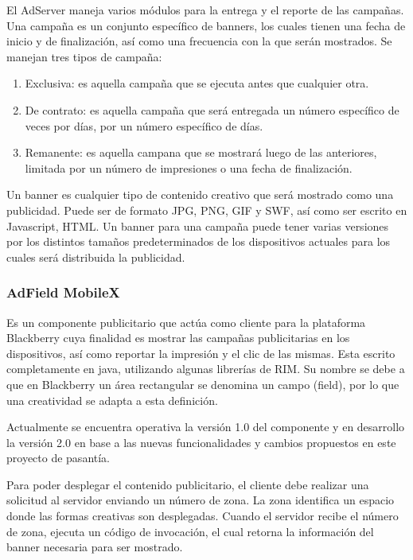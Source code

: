 El AdServer maneja varios módulos para la entrega y el reporte de
las campañas. Una campaña es un conjunto específico de banners, los
cuales tienen una fecha de inicio y de finalización, así como una
frecuencia con la que serán mostrados. Se manejan tres tipos de campaña:
\begin{enumerate}
\item Exclusiva: es aquella campaña que se ejecuta antes que cualquier otra. 
\item De contrato: es aquella campaña que será entregada un número específico
de veces por días, por un número específico de días. 
\item Remanente: es aquella campana que se mostrará luego de las anteriores,
limitada por un número de impresiones o una fecha de finalización. 
\end{enumerate}
Un banner es cualquier tipo de contenido creativo que será mostrado
como una publicidad. Puede ser de formato JPG, PNG, GIF y SWF, así
como ser escrito en Javascript, HTML. Un banner para una campaña puede
tener varias versiones por los distintos tamaños predeterminados de
los dispositivos actuales para los cuales será distribuida la publicidad.


\subsubsection{AdField MobileX}

Es un componente publicitario que actúa como cliente para la plataforma
Blackberry cuya finalidad es mostrar las campañas publicitarias en
los dispositivos, así como reportar la impresión y el clic de las
mismas. Esta escrito completamente en java, utilizando algunas librerías
de RIM. Su nombre se debe a que en Blackberry un área rectangular
se denomina un campo (field), por lo que una creatividad se adapta
a esta definición.

Actualmente se encuentra operativa la versión 1.0 del componente y
en desarrollo la versión 2.0 en base a las nuevas funcionalidades
y cambios propuestos en este proyecto de pasantía. 

Para poder desplegar el contenido publicitario, el cliente debe realizar
una solicitud al servidor enviando un número de zona. La zona identifica
un espacio donde las formas creativas son desplegadas. Cuando el servidor
recibe el número de zona, ejecuta un código de invocación, el cual
retorna la información del banner necesaria para ser mostrado.

